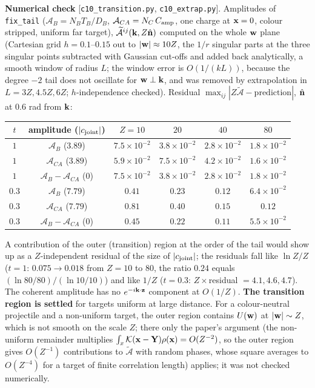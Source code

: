 \noindent\textbf{Numerical check} [\texttt{c10\_transition.py}, \texttt{c10\_extrap.py}]. Amplitudes of \texttt{fix\_tail} ($\mathcal A_B=N_BT_B/D_B$, $\mathcal A_{CA}=N_C\,C_{\rm amp}$, one charge at $\mathbf{x}=0$, colour stripped, uniform far target), $\widetilde{\mathcal A}^{ij}(\mathbf{k},Z\hat{\mathbf{n}})$ computed on the whole $\mathbf{w}$ plane (Cartesian grid $h=0.1$--$0.15$ out to $|\mathbf{w}|\approx10Z$, the $1/r$ singular parts at the three singular points subtracted with Gaussian cut-offs and added back analytically, a smooth window of radius $L$; the window error is $O(1/(kL))$, because the degree $-2$ tail does not oscillate for $\mathbf{w}\perp\mathbf{k}$, and was removed by extrapolation in $L=3Z,4.5Z,6Z$; $h$-independence checked). Residual $\max_{ij}|Z\widetilde{\mathcal A}-\text{prediction}|$, $\hat{\mathbf{n}}$ at $0.6$ rad from $\mathbf{k}$:
\begin{center}
\begin{tabular}{|c|c|cccc|}\hline
$t$ & amplitude ($|c_{\rm joint}|$) & $Z=10$ & $20$ & $40$ & $80$\\\hline
$1$ & $\mathcal A_B$ ($3.89$) & $7.5\times10^{-2}$ & $3.8\times10^{-2}$ & $2.8\times10^{-2}$ & $1.8\times10^{-2}$\\
$1$ & $\mathcal A_{CA}$ ($3.89$) & $5.9\times10^{-2}$ & $7.5\times10^{-2}$ & $4.2\times10^{-2}$ & $1.6\times10^{-2}$\\
$1$ & $\mathcal A_B-\mathcal A_{CA}$ ($0$) & $7.5\times10^{-2}$ & $3.8\times10^{-2}$ & $2.8\times10^{-2}$ & $1.8\times10^{-2}$\\
$0.3$ & $\mathcal A_B$ ($7.79$) & $0.41$ & $0.23$ & $0.12$ & $6.4\times10^{-2}$\\
$0.3$ & $\mathcal A_{CA}$ ($7.79$) & $0.81$ & $0.40$ & $0.15$ & $0.12$\\
$0.3$ & $\mathcal A_B-\mathcal A_{CA}$ ($0$) & $0.45$ & $0.22$ & $0.11$ & $5.5\times10^{-2}$\\\hline
\end{tabular}
\end{center}
A contribution of the outer (transition) region at the order of the tail would show up as a $Z$-independent residual of the size of $|c_{\rm joint}|$; the residuals fall like $\ln Z/Z$ ($t=1$: $0.075\to0.018$ from $Z=10$ to $80$, the ratio $0.24$ equals $(\ln80/80)/(\ln10/10)$) and like $1/Z$ ($t=0.3$: $Z\times$residual $=4.1,4.6,4.7$). The coherent amplitude has no $e^{-i\mathbf{k}\cdot\mathbf{z}}$ component at $O(1/Z)$. \textbf{The transition region is settled} for targets uniform at large distance. For a colour-neutral projectile and a non-uniform target, the outer region contains $U(\mathbf{w})$ at $|\mathbf{w}|\sim Z$, which is not smooth on the scale $Z$; there only the paper's argument (the non-uniform remainder multiplies $\int_x\mathcal K(\mathbf{x}-\mathbf{Y})\rho(\mathbf{x})=O(Z^{-2})$, so the outer region gives $O(Z^{-1})$ contributions to $\widetilde{\mathcal A}$ with random phases, whose square averages to $O(Z^{-4})$ for a target of finite correlation length) applies; it was not checked numerically.


